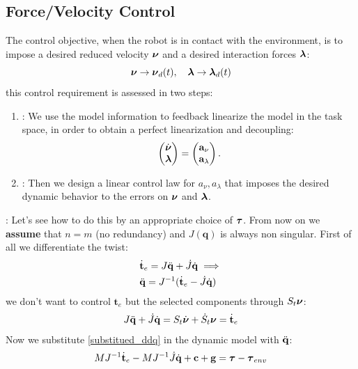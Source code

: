 \documentclass[10pt, a4paper]{report}
\newcommand{\q}{{\mathbf q}}
\begin{document}
\subsection{Force/Velocity Control}
The control objective, when the robot is in contact with the environment, is to impose a desired reduced velocity ${\boldsymbol{\nu}}$ and a desired interaction forces ${\boldsymbol{\lambda}}$:\begin{equation}
    \bnu\rightarrow\bnu_d(t), \ \ \ \blambda\rightarrow\blambda_d(t)
\end{equation}
this control requirement is assessed in two steps:\begin{enumerate}
    \item \textbf{{}}: We use the model information to feedback linearize the model in the task space, in order to obtain a perfect linearization and decoupling:\begin{equation}
        \begin{pmatrix}
            \dot{{\boldsymbol{\nu}}}\\
            {\boldsymbol{\lambda}}
        \end{pmatrix}=\begin{pmatrix}
            \mathbf a_\nu\\ 
            \mathbf a_\lambda
        \end{pmatrix}.
    \end{equation}
    \item \textbf{{}}: Then we design a linear control law for $a_\nu,a_\lambda$ that imposes the desired dynamic behavior to the errors on ${\boldsymbol{\nu}}$ and ${\boldsymbol{\lambda}}$.
\end{enumerate}
\noindent\textbf{{}}: Let's see how to do this by an appropriate choice of ${\boldsymbol{\tau}}$. From now on we \textbf{assume} that $n=m$ (no redundancy) and $J(\q)$ is always non singular. First of all we differentiate the twist:\begin{align}
    &\dot{\mathbf t}_e=J{\ddot{\mathbf q}}+\dot J{\dot{\mathbf q}}\implies\\ 
    &{\ddot{\mathbf q}}=J^{-1}(\dot{\mathbf t}_e-\dot J{\dot{\mathbf q}})\label{substitued_ddq}
\end{align}
we don't want to control $\mathbf t_e$ but the selected components through $S_t{\boldsymbol{\nu}}$:\begin{equation}
    J{\ddot{\mathbf q}}+\dot J{\dot{\mathbf q}}=S_t\dot{{\boldsymbol{\nu}}}+\dot S_t{\boldsymbol{\nu}}=\dot{\mathbf t}_e
\end{equation}
Now we substitute \eqref{substitued_ddq} in the dynamic model with ${\ddot{\mathbf q}}$:\begin{equation}
    MJ^{-1}\dot{\mathbf t}_e-MJ^{-1}\dot J{\dot{\mathbf q}}+\mathbf c+\mathbf g={\boldsymbol{\tau}}-{\boldsymbol{\tau}}_{env}
\end{equation}
\end{document}
